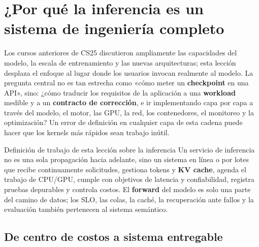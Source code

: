 \section{¿Por qué la inferencia es un sistema de ingeniería completo}

Los cursos anteriores de CS25 discutieron ampliamente las capacidades del modelo, la escala de entrenamiento y las nuevas arquitecturas; esta lección desplaza el enfoque al lugar donde los usuarios invocan realmente al modelo. La pregunta central no es tan estrecha como «cómo meter un \textbf{checkpoint} en una API», sino: ¿cómo traducir los requisitos de la aplicación a una \textbf{workload} medible y a un \textbf{contracto de corrección}, e ir implementando capa por capa a través del modelo, el motor, las GPU, la red, los contenedores, el monitoreo y la optimización? Un error de definición en cualquier capa de esta cadena puede hacer que los kernels más rápidos sean trabajo inútil.


\begin{importantbox}{Definición de trabajo de esta lección sobre la inferencia}
Un servicio de inferencia no es una sola propagación hacia adelante, sino un sistema en línea o por lotes que recibe continuamente solicitudes, gestiona tokens y \textbf{KV cache}, agenda el trabajo de CPU/GPU, cumple con objetivos de latencia y confiabilidad, registra pruebas depurables y controla costos. El \textbf{forward} del modelo es solo una parte del camino de datos; los SLO, las colas, la caché, la recuperación ante fallos y la evaluación también pertenecen al sistema semántico.
\end{importantbox}


\subsection{De centro de costos a sistema entregable}

